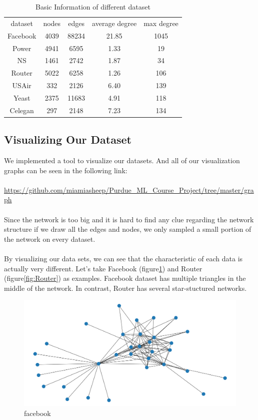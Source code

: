 \documentclass[12pt]{article}
\begin{document}
\begin{table}
	\begin{center}
		\begin{tabular}{|c|c|c|c|c|}
			\hline
			dataset & nodes & edges & average degree & max degree \\
			Facebook & 4039 & 88234 & 21.85 & 1045 \\
			Power & 4941 & 6595 & 1.33 & 19 \\
			NS & 1461 & 2742 & 1.87 & 34 \\
			Router & 5022 & 6258 & 1.26 & 106 \\
			USAir & 332 & 2126 & 6.40 & 139 \\
			Yeast & 2375 & 11683 & 4.91 & 118 \\
			Celegan & 297 & 2148 & 7.23 & 134 \\
			\hline 
		\end{tabular}
		\caption{Basic Information of different dataset}
		\label{tab:info}
	\end{center}
\end{table}

\subsection{Visualizing Our Dataset}
We implemented a tool to visualize our datasets. And all of our visualization graphs can be seen in the following link:
\\
\\
\url{https://github.com/miamiasheep/Purdue_ML_Course_Project/tree/master/graph}
\\
\\
Since the network is too big and it is hard to find any clue regarding the network structure if we draw all the edges and nodes, we only sampled a small portion of the network on every dataset.
\\
\\
By visualizing our data sets, we can see that the characteristic of each data is actually very different. Let's take Facebook (figure\ref{fig:facebook}) and Router (figure\ref{fig:Router}) as examples. Facebook dataset has multiple triangles in the middle of the network. In contrast, Router has several star-stuctured networks.


\begin{figure}[h]
	\centering
	\includegraphics[scale=0.3]{Facebook}
	\caption{facebook}
	\label{fig:facebook}
\end{figure}
\end{document}

